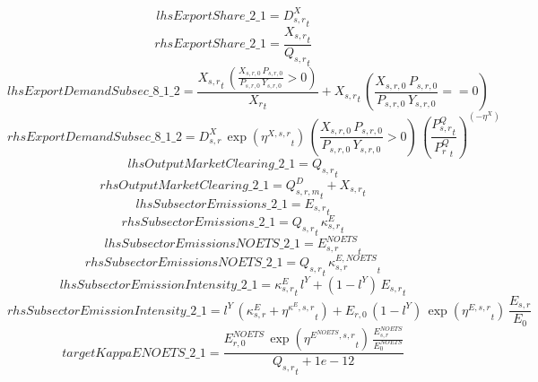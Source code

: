 \begin{dmath*}
lhsExportShare\_2\_1 = {{D^{X}_{s,r}}}_{t}
\end{dmath*}
\begin{dmath*}
rhsExportShare\_2\_1 = \frac{{{X_{s,r}}}_{t}}{{{Q_{s,r}}}_{t}}
\end{dmath*}
\begin{dmath*}
lhsExportDemandSubsec\_8\_1\_2 = \frac{{{X_{s,r}}}_{t}\, \left({\frac{X_{s,r,0} \, P_{s,r,0}}{P_{s,r,0} \, Y_{s,r,0}}}>0\right)}{{{X_r}}_{t}}+{{X_{s,r}}}_{t}\, \left({\frac{X_{s,r,0} \, P_{s,r,0}}{P_{s,r,0} \, Y_{s,r,0}}}==0\right)
\end{dmath*}
\begin{dmath*}
rhsExportDemandSubsec\_8\_1\_2 = {{D^{X}_{s,r}}}\, \exp\left({{\eta^{X,s,r}}}_{t}\right)\, \left({\frac{X_{s,r,0} \, P_{s,r,0}}{P_{s,r,0} \, Y_{s,r,0}}}>0\right)\, \left(\frac{{{P^Q_{s,r}}}_{t}}{{{P^Q_{r}}}_{t}}\right)^{\left(-{{\eta^{X}}}\right)}
\end{dmath*}
\begin{dmath*}
lhsOutputMarketClearing\_2\_1 = {{Q_{s,r}}}_{t}
\end{dmath*}
\begin{dmath*}
rhsOutputMarketClearing\_2\_1 = {{Q^D_{s,r,m}}}_{t}+{{X_{s,r}}}_{t}
\end{dmath*}
\begin{dmath*}
lhsSubsectorEmissions\_2\_1 = {{E_{s,r}}}_{t}
\end{dmath*}
\begin{dmath*}
rhsSubsectorEmissions\_2\_1 = {{Q_{s,r}}}_{t}\, {{\kappa^{E}_{s,r}}}_{t}
\end{dmath*}
\begin{dmath*}
lhsSubsectorEmissionsNOETS\_2\_1 = {{E^{NOETS}_{s,r}}}_{t}
\end{dmath*}
\begin{dmath*}
rhsSubsectorEmissionsNOETS\_2\_1 = {{Q_{s,r}}}_{t}\, {{\kappa^{E,NOETS}_{s,r}}}_{t}
\end{dmath*}
\begin{dmath*}
lhsSubsectorEmissionIntensity\_2\_1 = {{\kappa^{E}_{s,r}}}_{t}\, {{l^{Y}}}+\left(1-{{l^{Y}}}\right)\, {{E_{s,r}}}_{t}
\end{dmath*}
\begin{dmath*}
rhsSubsectorEmissionIntensity\_2\_1 = {{l^{Y}}}\, \left({{\kappa^{E}_{s,r}}}+{{\eta^{\kappa^{E},s,r}}}_{t}\right)+{{E_{r,0}}}\, \left(1-{{l^{Y}}}\right)\, \exp\left({{\eta^{E,s,r}}}_{t}\right)\, {{\frac{E_{s,r}}{E_0}}}
\end{dmath*}
\begin{dmath*}
targetKappaENOETS\_2\_1 = \frac{{{E^{NOETS}_{r,0}}}\, \exp\left({{\eta^{E^{NOETS},s,r}}}_{t}\right)\, {{\frac{E^{NOETS}_{s,r}}{E^{NOETS}_0}}}}{{{Q_{s,r}}}_{t}+1e-12}
\end{dmath*}
